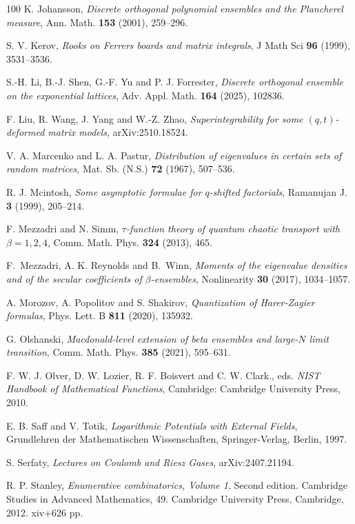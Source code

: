 \documentclass{amsart}
\theoremstyle{plain}
\theoremstyle{remark}
\numberwithin{equation}{section}
\begin{document}
\begin{thebibliography}{100}
  K. Johansson, \emph{Discrete orthogonal polynomial ensembles and the Plancherel measure}, Ann. Math. \textbf{153} (2001), 259--296.

 S. V. Kerov, \emph{Rooks on Ferrers boards and matrix integrals}, J Math Sci \textbf{96} (1999), 3531--3536.

 S.-H. Li, B.-J. Shen, G.-F. Yu and  P. J. Forrester, \emph{Discrete orthogonal ensemble on the exponential lattices}, Adv. Appl. Math. \textbf{164} (2025), 102836.

 F. Liu, R. Wang, J. Yang and W.-Z. Zhao, \emph{Superintegrability for some $(q,t)$-deformed matrix models}, arXiv:2510.18524. 

 V. A. Marcenko and L. A. Pastur, \emph{Distribution of eigenvalues in certain sets of random matrices}, Mat. Sb. (N.S.) \textbf{72} (1967), 507--536.

 R. J. Mcintosh, \emph{Some asymptotic formulae for $q$-shifted factorials}, Ramanujan J. \textbf{3} (1999), 205--214.

 F. Mezzadri and N. Simm, \emph{$\tau$-function theory of quantum chaotic transport with $\beta = 1, 2, 4$}, Comm. Math. Phys. \textbf{324} (2013), 465.

 F.~Mezzadri, A. K. Reynolds and B.~Winn, \emph{Moments of the eigenvalue densities and of the secular coefficients of $\beta$-ensembles}, Nonlinearity \textbf{30} (2017), 1034--1057.

 A. Morozov, A. Popolitov and S. Shakirov, \emph{Quantization of Harer-Zagier formulas}, Phys. Lett. B \textbf{811} (2020), 135932. 

 G. Olshanski, \emph{Macdonald-level extension of beta ensembles and large-$N$ limit transition}, Comm. Math. Phys. \textbf{385} (2021), 595--631. 

  F. W. J. Olver, D. W. Lozier, R. F. Boisvert and C. W. Clark., eds. \emph{NIST Handbook of Mathematical Functions}, Cambridge: Cambridge University Press, 2010.

 E. B. Saff and V. Totik, \emph{Logarithmic Potentials with External Fields}, Grundlehren der Mathematischen Wissenschaften, Springer-Verlag, Berlin, 1997.
 
 S. Serfaty, \emph{Lectures on Coulomb and Riesz Gases}, arXiv:2407.21194.  

 R. P. Stanley, \emph{Enumerative combinatorics, Volume 1}, Second edition. Cambridge Studies in Advanced Mathematics, 49. Cambridge University Press, Cambridge, 2012. xiv+626 pp.


\end{thebibliography}
\end{document}
